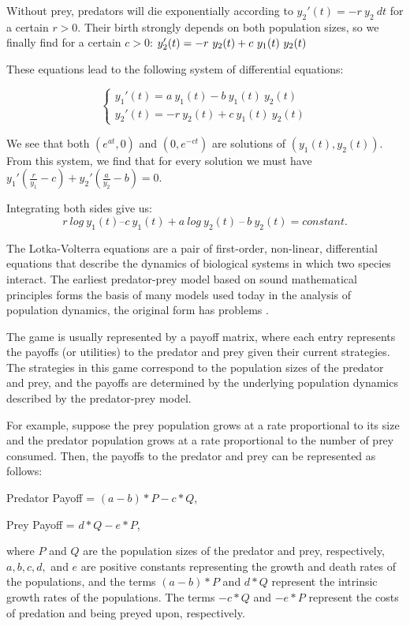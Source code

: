Without prey, predators will die exponentially according to \(y_2'(t)=-r\ y_2\ dt\) for a certain \(r>0\). Their birth strongly depends on both population sizes, so we finally find for a certain \(c>0\):
\( \\ y_2'(t) = -r\ y_2(t) + c\ y_1(t)\ y_2(t)  \)

These equations lead to the following system of differential equations:  

$$ \left\{
\begin{array}{lr}
y_1'(t) = a\ y_1(t) - b\ y_1(t)\ y_2(t)\\
y_2'(t) = -r\ y_2(t) + c\ y_1(t)\ y_2(t)
\end{array}
\right. $$
\newline
 
We see that both \(( e^{at}, 0)\) and \((0, e^{-ct} )\) are solutions of \((y_1(t), y_2(t))\). From this system, we find that for every solution we must have 
\(y_1' (\frac{r}{y_1} - c) +y_2' (\frac{a}{y_2} - b) = 0 \).

Integrating both sides give us: 
\[r\ log\ y_1(t) – c\ y_1(t) + a\ log\ y_2(t)\ –\ b\ y_2(t) = constant. \]

The Lotka-Volterra equations are a pair of first-order, non-linear, differential equations that describe the dynamics of biological systems in which two species interact. The earliest predator-prey model based on sound mathematical principles forms the basis of many models used today in the analysis of population dynamics, the original form has problems \cite{cpp1}.

The game is usually represented by a payoff matrix, where each entry represents the payoffs (or utilities) to the predator and prey given their current strategies. The strategies in this game correspond to the population sizes of the predator and prey, and the payoffs are determined by the underlying population dynamics described by the predator-prey model.

For example, suppose the prey population grows at a rate proportional to its size and the predator population grows at a rate proportional to the number of prey consumed. Then, the payoffs to the predator and prey can be represented as follows:


Predator Payoff = \((a - b) * P - c * Q\),

Prey Payoff = \(d * Q - e * P\),


where \(P\) and \(Q\) are the population sizes of the predator and prey, respectively, \(a, b, c, d,\) and \(e\) are positive constants representing the growth and death rates of the populations, and the terms \((a - b) * P\) and \(d * Q\) represent the intrinsic growth rates of the populations. The terms \(-c * Q\) and \(-e * P\) represent the costs of predation and being preyed upon, respectively.

